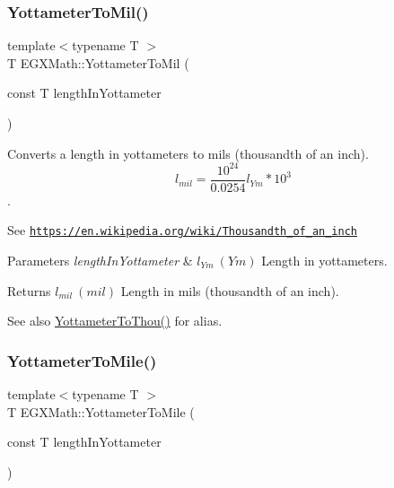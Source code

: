 \subsubsection{\texorpdfstring{Yottameter\+To\+Mil()}{YottameterToMil()}}
{\footnotesize\ttfamily template$<$typename T $>$ \\
T E\+G\+X\+Math\+::\+Yottameter\+To\+Mil (\begin{DoxyParamCaption}\item[{const T}]{length\+In\+Yottameter }\end{DoxyParamCaption})}



Converts a length in yottameters to mils (thousandth of an inch). \[ l_{mil}= \frac{10^{24}}{0.0254} l_{Ym} * 10^{3} \]. 

See \href{https://en.wikipedia.org/wiki/Thousandth_of_an_inch}{\tt https\+://en.\+wikipedia.\+org/wiki/\+Thousandth\+\_\+of\+\_\+an\+\_\+inch} 
\begin{DoxyParams}{Parameters}
{\em length\+In\+Yottameter} & $ l_{Ym}\ (Ym)$ Length in yottameters. \\
\hline
\end{DoxyParams}
\begin{DoxyReturn}{Returns}
$ l_{mil}\ (mil)$ Length in mils (thousandth of an inch). 
\end{DoxyReturn}
\begin{DoxySeeAlso}{See also}
\mbox{\hyperlink{group___e_g_x_math-_conversions-_length_conversions-_yottameter-_imperial_ga9bf8eeca799b8246932d4aeaac425d87}{Yottameter\+To\+Thou()}} for alias. 
\end{DoxySeeAlso}
\mbox{\label{group___e_g_x_math-_conversions-_length_conversions-_yottameter-_imperial_ga4ca41b9b222f31926417df30e0539b50}} 
\subsubsection{\texorpdfstring{Yottameter\+To\+Mile()}{YottameterToMile()}}
{\footnotesize\ttfamily template$<$typename T $>$ \\
T E\+G\+X\+Math\+::\+Yottameter\+To\+Mile (\begin{DoxyParamCaption}\item[{const T}]{length\+In\+Yottameter }\end{DoxyParamCaption})}



